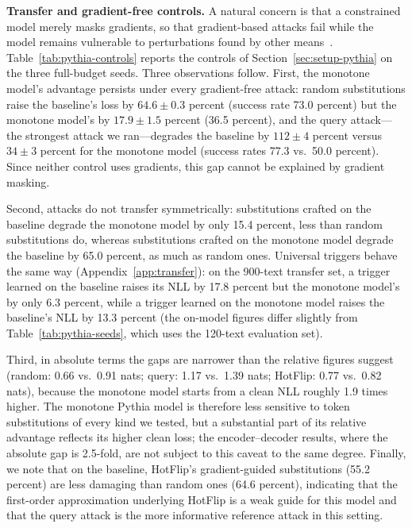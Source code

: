 \documentclass{article}
\theoremstyle{plain}
\theoremstyle{definition}
\theoremstyle{remark}
\begin{document}
\textbf{Transfer and gradient-free controls.}
A natural concern is that a constrained model merely masks gradients, so that gradient-based attacks fail while the model remains vulnerable to perturbations found by other means~\citep{athalye2018obfuscated,carlini2019evaluating,tramer2020adaptive}. Table~\ref{tab:pythia-controls} reports the controls of Section~\ref{sec:setup-pythia} on the three full-budget seeds. Three observations follow. First, the monotone model's advantage persists under every gradient-free attack: random substitutions raise the baseline's loss by $64.6 \pm 0.3$ percent (success rate 73.0 percent) but the monotone model's by $17.9 \pm 1.5$ percent (36.5 percent), and the query attack---the strongest attack we ran---degrades the baseline by $112 \pm 4$ percent versus $34 \pm 3$ percent for the monotone model (success rates 77.3 vs.\ 50.0 percent). Since neither control uses gradients, this gap cannot be explained by gradient masking.

Second, attacks do not transfer symmetrically: substitutions crafted on the baseline degrade the monotone model by only 15.4 percent, less than random substitutions do, whereas substitutions crafted on the monotone model degrade the baseline by 65.0 percent, as much as random ones. Universal triggers behave the same way (Appendix~\ref{app:transfer}): on the 900-text transfer set, a trigger learned on the baseline raises its NLL by 17.8 percent but the monotone model's by only 6.3 percent, while a trigger learned on the monotone model raises the baseline's NLL by 13.3 percent (the on-model figures differ slightly from Table~\ref{tab:pythia-seeds}, which uses the 120-text evaluation set).

Third, in absolute terms the gaps are narrower than the relative figures suggest (random: 0.66 vs.\ 0.91 nats; query: 1.17 vs.\ 1.39 nats; HotFlip: 0.77 vs.\ 0.82 nats), because the monotone model starts from a clean NLL roughly 1.9 times higher. The monotone Pythia model is therefore less sensitive to token substitutions of every kind we tested, but a substantial part of its relative advantage reflects its higher clean loss; the encoder--decoder results, where the absolute gap is 2.5-fold, are not subject to this caveat to the same degree. Finally, we note that on the baseline, HotFlip's gradient-guided substitutions (55.2 percent) are less damaging than random ones (64.6 percent), indicating that the first-order approximation underlying HotFlip is a weak guide for this model and that the query attack is the more informative reference attack in this setting.
\end{document}
